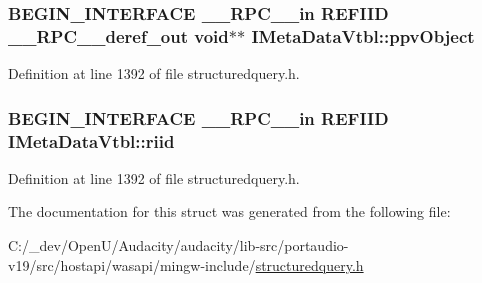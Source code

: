 \subsubsection[{\texorpdfstring{ppv\+Object}{ppvObject}}]{\setlength{\rightskip}{0pt plus 5cm}B\+E\+G\+I\+N\+\_\+\+I\+N\+T\+E\+R\+F\+A\+CE {\bf \+\_\+\+\_\+\+R\+P\+C\+\_\+\+\_\+in} {\bf R\+E\+F\+I\+ID} {\bf \+\_\+\+\_\+\+R\+P\+C\+\_\+\+\_\+deref\+\_\+out} {\bf void}$\ast$$\ast$ I\+Meta\+Data\+Vtbl\+::ppv\+Object}\hypertarget{struct_i_meta_data_vtbl_aa7af8ff2762e620e1610ea909e461036}{}\label{struct_i_meta_data_vtbl_aa7af8ff2762e620e1610ea909e461036}


Definition at line 1392 of file structuredquery.\+h.

\subsubsection[{\texorpdfstring{riid}{riid}}]{\setlength{\rightskip}{0pt plus 5cm}B\+E\+G\+I\+N\+\_\+\+I\+N\+T\+E\+R\+F\+A\+CE {\bf \+\_\+\+\_\+\+R\+P\+C\+\_\+\+\_\+in} {\bf R\+E\+F\+I\+ID} I\+Meta\+Data\+Vtbl\+::riid}\hypertarget{struct_i_meta_data_vtbl_adced4a86b61b4f9a49651473dccbbe06}{}\label{struct_i_meta_data_vtbl_adced4a86b61b4f9a49651473dccbbe06}


Definition at line 1392 of file structuredquery.\+h.



The documentation for this struct was generated from the following file\+:\begin{DoxyCompactItemize}
\item 
C\+:/\+\_\+dev/\+Open\+U/\+Audacity/audacity/lib-\/src/portaudio-\/v19/src/hostapi/wasapi/mingw-\/include/\hyperlink{structuredquery_8h}{structuredquery.\+h}\end{DoxyCompactItemize}
